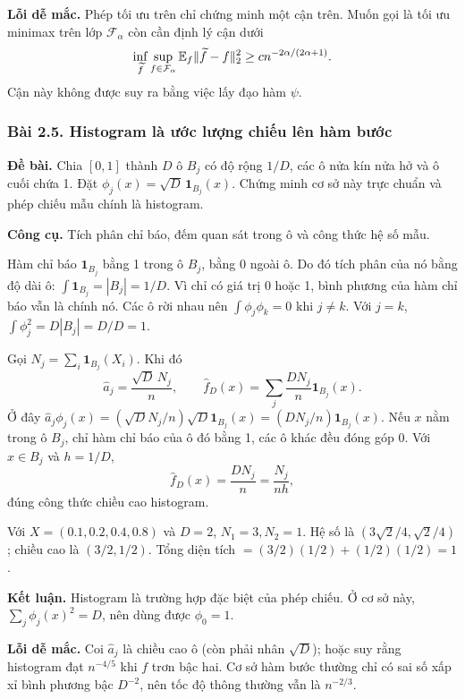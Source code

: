 \textbf{Lỗi dễ mắc.} Phép tối ưu trên chỉ chứng minh một cận trên.
Muốn gọi là tối ưu minimax trên lớp $\mathcal F_\alpha$ còn cần định lý cận dưới
\[
\inf_{\widetilde f}\sup_{f\in\mathcal F_\alpha}
\mathbb E_f\|\widetilde f-f\|_2^2\geq c n^{-2\alpha/(2\alpha+1)}.
\]
Cận này không được suy ra bằng việc lấy đạo hàm $\psi$.

\subsubsection*{Bài 2.5. Histogram là ước lượng chiếu lên hàm bước}\label{ot45:histogram}
\textbf{Đề bài.} Chia $[0,1]$ thành $D$ ô $B_j$ có độ rộng $1/D$,
các ô nửa kín nửa hở và ô cuối chứa 1. Đặt
$\phi_j(x)=\sqrt D\,\mathbf1_{B_j}(x)$.
Chứng minh cơ sở này trực chuẩn và phép chiếu mẫu chính là histogram.

\textbf{Công cụ.} Tích phân chỉ báo, đếm quan sát trong ô và công thức hệ số mẫu.

Hàm chỉ báo $\mathbf1_{B_j}$ bằng 1 trong ô $B_j$, bằng 0 ngoài ô.
Do đó tích phân của nó bằng độ dài ô: $\int\mathbf1_{B_j}=|B_j|=1/D$.
Vì chỉ có giá trị 0 hoặc 1, bình phương của hàm chỉ báo vẫn là chính nó.
Các ô rời nhau nên $\int\phi_j\phi_k=0$ khi $j\ne k$.
Với $j=k$, $\int\phi_j^2=D|B_j|=D/D=1$.

Gọi $N_j=\sum_i\mathbf1_{B_j}(X_i)$. Khi đó
\[
\widehat a_j=\frac{\sqrt D\,N_j}{n},\qquad
\widehat f_D(x)=\sum_j\frac{D N_j}{n}\mathbf1_{B_j}(x).
\]
Ở đây $\widehat a_j\phi_j(x)
=(\sqrt D N_j/n)\sqrt D\mathbf1_{B_j}(x)
=(DN_j/n)\mathbf1_{B_j}(x)$.
Nếu $x$ nằm trong ô $B_j$, chỉ hàm chỉ báo của ô đó bằng 1,
các ô khác đều đóng góp 0.
Với $x\in B_j$ và $h=1/D$,
\[
\boxed{\widehat f_D(x)=\frac{DN_j}{n}=\frac{N_j}{nh},}
\]
đúng công thức chiều cao histogram.

Với $X=(0.1,0.2,0.4,0.8)$ và $D=2$, $N_1=3,N_2=1$.
Hệ số là $(3\sqrt2/4,\sqrt2/4)$; chiều cao là $(3/2,1/2)$.
Tổng diện tích $=(3/2)(1/2)+(1/2)(1/2)=1$.

\textbf{Kết luận.} Histogram là trường hợp đặc biệt của phép chiếu.
Ở cơ sở này, $\sum_j\phi_j(x)^2=D$, nên dùng được $\phi_0=1$.

\textbf{Lỗi dễ mắc.} Coi $\widehat a_j$ là chiều cao ô (còn phải nhân $\sqrt D$);
hoặc suy rằng histogram đạt $n^{-4/5}$ khi $f$ trơn bậc hai.
Cơ sở hàm bước thường chỉ có sai số xấp xỉ bình phương bậc $D^{-2}$,
nên tốc độ thông thường vẫn là $n^{-2/3}$.

